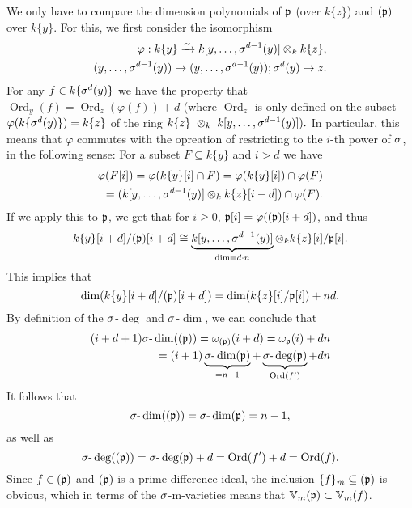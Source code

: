 \begin{theorem}
\begin{bew}
We only have to compare the dimension polynomials of $\mathfrak{p}$ (over $k\{z\}$) and $(\mathfrak{p})$ over $k\{y\}$.
For this, we first consider the isomorphism
\begin{align*} \varphi: k\{y\} \xrightarrow{\sim} k[y,\ldots,\sigma^{d-1}(y)] \otimes_k k\{z\}, \\ (y,\ldots,\sigma^{d-1}(y)) \mapsto (y,\ldots,\sigma^{d-1}(y)); \sigma^d(y) \mapsto z. \end{align*}
For any $f \in k\{\sigma^{d}(y)\}$ we have the property that $\operatorname{Ord}_y(f) = \operatorname{Ord}_z(\varphi(f)) + d$ (where $\operatorname{Ord}_z$ is only defined on the subset $\varphi(k\{\sigma^d(y)\}) = k\{z\}$ of the ring $k\{z\}~\otimes_k~k[y,\ldots,\sigma^{d-1}(y)]).$
In particular, this means that $\varphi$ commutes with the opreation of restricting to the $i$-th power of $\sigma$, in the following sense:
For a subset $F \subseteq k\{y\}$ and $i > d$ we have
\begin{align*} \varphi(F[i]) = \varphi(k\{y\}[i] \cap F) = \varphi(k\{y\}[i]) \cap \varphi(F) \\
 = (k[y,\ldots,\sigma^{d-1}(y)] \otimes_k k\{z\}[i-d]) \cap \varphi(F) .\end{align*}
If we apply this to $\mathfrak{p}$, we get that for $i\geq 0$, $\mathfrak{p}[i] = \varphi((\mathfrak{p})[i+d])$, and thus 
$$ k\{y\}[i+d]/(\mathfrak{p})[i+d] \cong \underbrace{k[y,\ldots,\sigma^{d-1}(y)]}_{ \text{dim} = d \cdot n} \otimes_k k\{z\}[i]/\mathfrak{p}[i].$$
This implies that 
$$\operatorname{dim}(k\{y\}[i+d]/(\mathfrak{p})[i+d]) = \operatorname{dim}(k\{z\}[i]/\mathfrak{p}[i]) + nd.$$
By definition of the $\sigma$-$\operatorname{deg}$ and $\sigma$-$\operatorname{dim}$, we can conclude that 
\begin{align*}
(i+d+1) \sigma\text{-}\operatorname{dim}( (\mathfrak{p}) ) = \omega_{(\mathfrak{p})}(i+d) = \omega_{\mathfrak{p}}(i) + dn \\
= (i+1) \underbrace{\sigma\text{-}\operatorname{dim}(\mathfrak{p})}_{ = n - 1} + \underbrace{\sigma\text{-}\operatorname{deg}(\mathfrak{p})}_{\operatorname{Ord}(f')} + dn
\end{align*}
It follows that 
$$\sigma\text{-}\operatorname{dim}((\mathfrak{p}))= \sigma\text{-}\operatorname{dim}(\mathfrak{p}) = n-1, $$
as well as
$$\sigma\text{-}\operatorname{deg}((\mathfrak{p}))= \sigma\text{-}\operatorname{deg}(\mathfrak{p}) + d = \operatorname{Ord}(f') + d = \operatorname{Ord}(f).$$
Since $f \in (\mathfrak{p})$ and $(\mathfrak{p})$ is a prime difference ideal, the inclusion $\{f\}_m \subseteq (\mathfrak{p})$ is obvious, which in terms of the $\sigma$-m-varieties means that $\mathbb{V}_m(\mathfrak{p}) \subset \mathbb{V}_m(f)$. 

\end{bew}
\end{theorem}

